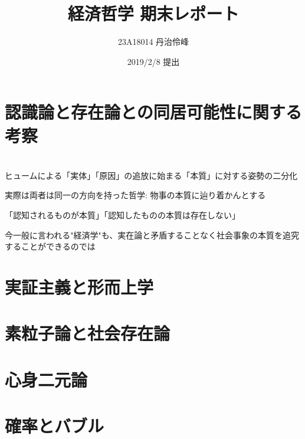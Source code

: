 \documentclass[11pt]{jsarticle}
\begin{document}
\title{経済哲学 期末レポート}
\author{23A18014 丹治伶峰}
\date{2019/2/8 提出}
\maketitle

\section*{認識論と存在論との同居可能性に関する考察}

\section{}

ヒュームによる「実体」「原因」の追放に始まる「本質」に対する姿勢の二分化

実際は両者は同一の方向を持った哲学: 物事の本質に辿り着かんとする

「認知されるものが本質」「認知したものの本質は存在しない」

今一般に言われる"経済学"も、実在論と矛盾することなく社会事象の本質を追究することができるのでは

\section{実証主義と形而上学}

\section{素粒子論と社会存在論}

\section{心身二元論}

\section{確率とバブル}
\end{document}
